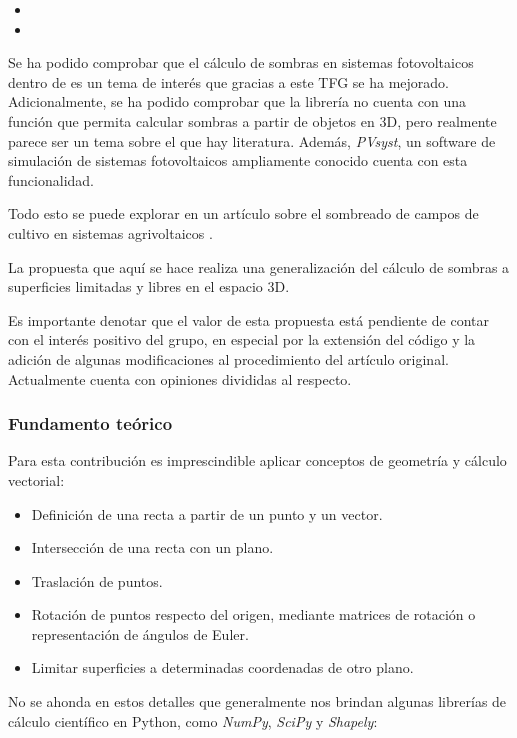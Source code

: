 \begin{itemize}
    \item {}
    \item {}
\end{itemize}

Se ha podido comprobar que el cálculo de sombras en sistemas fotovoltaicos dentro de \pvlibpy{} es un tema de interés que gracias a este TFG se ha mejorado. Adicionalmente, se ha podido comprobar que la librería no cuenta con una función que permita calcular sombras a partir de objetos en 3D, pero realmente parece ser un tema sobre el que hay literatura. Además, \textit{PVsyst}, un software de simulación de sistemas fotovoltaicos ampliamente conocido cuenta con esta funcionalidad.

Todo esto se puede explorar en un artículo sobre el sombreado de campos de cultivo en sistemas agrivoltaicos \cite{Zainali_Ma_Lu_Stridh_Avelin_Amaducci_Colauzzi_Campana_2023}.

La propuesta que aquí se hace realiza una generalización del cálculo de sombras a superficies limitadas y libres en el espacio 3D.

Es importante denotar que el valor de esta propuesta está pendiente de contar con el interés positivo del grupo, en especial por la extensión del código y la adición de algunas modificaciones al procedimiento del artículo original. Actualmente cuenta con opiniones divididas al respecto.

\subsubsection{Fundamento teórico}

Para esta contribución es imprescindible aplicar conceptos de geometría y cálculo vectorial:

\begin{itemize}
    \item Definición de una recta a partir de un punto y un vector.
    \item Intersección de una recta con un plano.
    \item Traslación de puntos.
    \item Rotación de puntos respecto del origen, mediante matrices de rotación o representación de ángulos de Euler.
    \item Limitar superficies a determinadas coordenadas de otro plano.
\end{itemize}

No se ahonda en estos detalles que generalmente nos brindan algunas librerías de cálculo científico en Python, como \textit{NumPy}, \textit{SciPy} y \textit{Shapely}:


